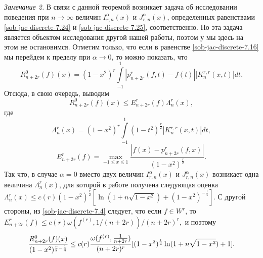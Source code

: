 \textit{Замечание 2.} В связи с данной теоремой возникает задача об исследовании поведения при $n\to\infty$ величин $I^\alpha_{r,n}(x)$ и $J^\alpha_{r,n}(x)$, определенных равенствами  \eqref{sob-jac-discrete-7.24} и \eqref{sob-jac-discrete-7.25}, соответственно. Но эта задача является объектом исследования другой нашей работы, поэтом
у мы здесь на этом не остановимся.
Отметим только, что если в равенстве \eqref{sob-jac-discrete-7.16} мы перейдем к пределу при $\alpha\to0$, то можно показать, что
$$
R_{n+2r}^0(f)(x)=(1-x^2)^r\int\limits_{-1}^1|p_{n+2r}^r(f,t)-f(t)|
|K_{n}^{r,r}(x,t)|dt.
$$
Отсюда, в свою очередь, выводим
$$
R_{n+2r}^0(f)(x)\le E_{n+2r}^r(f)\Lambda_{n}^r(x),
$$
где
$$
\Lambda_{n}^r(x)=(1-x^2)^r\int\limits_{-1}^1(1-t^2)^{\frac{r}{2}}|K_{n}^{r,r}(x,t)|dt,
$$
$$
E_{n+2r}^r(f)=\max_{-1\le x\le1}\frac{|f(x)-p_{n+2r}^r(f,x)|}{(1-x^2)^\frac{r}{2}}.
$$
Так что, в случае $\alpha=0$ вместо двух величин $I^\alpha_{r,n}(x)$ и $J^\alpha_{r,n}(x)$ возникает одна величина  $\Lambda_{n}^r(x)$, для которой в работе \cite{sob-jac-discrete-Shar15} получена следующая оценка
$
\Lambda_{n}^r(x)\le c(r)(1-x^2)^{\frac{r}{2}}[\ln(1+n\sqrt{1-x^2})+(1-x^2)^{-\frac{1}{4}}].
$
С другой стороны, из \eqref{sob-jac-discrete-7.4} следует, что если $f\in W^r$, то
$
E_{n+2r}^r(f)\le c(r)\omega(f^{(r)},1/(n+2r))/(n+2r)^r,
$
и поэтому
$$
\frac{R_{n+2r}^0(f)(x)}{(1-x^2)^{\frac{r}{2}-\frac14}}\le c(r)\frac{\omega(f^{(r)},{1\over n+2r})}{(n+2r)^r}[(1-x^2)^{\frac{1}{4}}\ln(1+n\sqrt{1-x^2})+1].
$$
